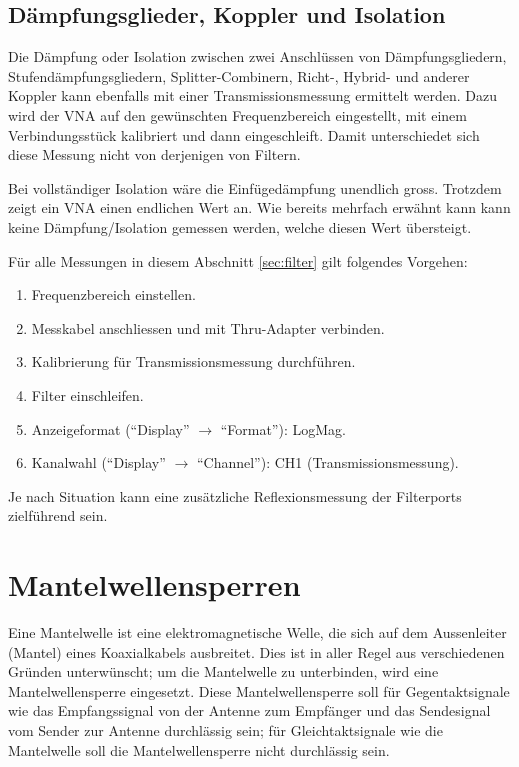 \documentclass[twoside,a4paper,11pt,halfparskip,DIV=11,notitlepage]{scrartcl}
\begin{document}
\subsection{Dämpfungsglieder, Koppler und Isolation}
Die Dämpfung oder Isolation zwischen zwei Anschlüssen von Dämpfungsgliedern,
Stufendämpfungsgliedern, Splitter-Combinern, Richt-, Hybrid- und anderer Koppler
kann ebenfalls mit einer Transmissionsmessung ermittelt werden. Dazu wird der VNA auf den
gewünschten Frequenzbereich eingestellt, mit einem Verbindungsstück kalibriert
und dann eingeschleift. Damit unterschiedet sich diese Messung nicht von derjenigen
von Filtern.

Bei vollständiger Isolation wäre die Einfügedämpfung unendlich gross. Trotzdem
zeigt ein VNA einen endlichen Wert an. Wie bereits mehrfach erwähnt kann kann
keine Dämpfung/Isolation gemessen werden, welche diesen Wert übersteigt.

Für alle Messungen in diesem Abschnitt \ref{sec:filter} gilt folgendes Vorgehen:

\begin{enumerate}
    \item Frequenzbereich einstellen.
    \item Messkabel anschliessen und mit Thru-Adapter verbinden.
    \item Kalibrierung für Transmissionsmessung durchführen.
    \item Filter einschleifen.
    \item Anzeigeformat (``Display'' $\longrightarrow$ ``Format''): LogMag.
    \item Kanalwahl (``Display'' $\longrightarrow$ ``Channel''): CH1 (Transmissionsmessung).
\end{enumerate}

Je nach Situation kann eine zusätzliche Reflexionsmessung der Filterports zielführend sein.

\newpage %
\section{Mantelwellensperren}
Eine Mantelwelle ist eine elektromagnetische Welle, die sich auf dem Aussenleiter (Mantel) eines
Koaxialkabels ausbreitet. Dies ist in aller Regel aus verschiedenen Gründen
unterwünscht; um die Mantelwelle zu unterbinden, wird eine Mantelwellensperre
eingesetzt. Diese Mantelwellensperre soll für Gegentaktsignale wie das
Empfangssignal von der Antenne zum Empfänger und das Sendesignal vom Sender
zur Antenne durchlässig sein; für Gleichtaktsignale wie die Mantelwelle soll
die Mantelwellensperre nicht durchlässig sein.
\end{document}
